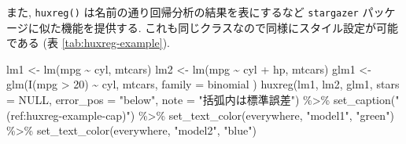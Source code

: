 \documentclass[
  xelatex,ja=standard,jafont=noto]{bxjsbook}
\newenvironment{Shaded}{\begin{snugshade}}{\end{snugshade}}
\newcommand{\AttributeTok}[1]{\textcolor[rgb]{0.77,0.63,0.00}{#1}}
\newcommand{\ConstantTok}[1]{\textcolor[rgb]{0.00,0.00,0.00}{#1}}
\newcommand{\DecValTok}[1]{\textcolor[rgb]{0.00,0.00,0.81}{#1}}
\newcommand{\FunctionTok}[1]{\textcolor[rgb]{0.00,0.00,0.00}{#1}}
\newcommand{\NormalTok}[1]{#1}
\newcommand{\OtherTok}[1]{\textcolor[rgb]{0.56,0.35,0.01}{#1}}
\newcommand{\SpecialCharTok}[1]{\textcolor[rgb]{0.00,0.00,0.00}{#1}}
\newcommand{\StringTok}[1]{\textcolor[rgb]{0.31,0.60,0.02}{#1}}
\theoremstyle{definition}
\theoremstyle{definition}
\theoremstyle{definition}
\theoremstyle{definition}
\theoremstyle{remark}
\begin{document}
また, \texttt{huxreg()} は名前の通り回帰分析の結果を表にするなど
\texttt{stargazer} パッケージに似た機能を提供する.
これも同じクラスなので同様にスタイル設定が可能である (表
\ref{tab:huxreg-example}).



\begin{Shaded}
\begin{Highlighting}[numbers=left,,]
\NormalTok{lm1 }\OtherTok{\textless{}{-}} \FunctionTok{lm}\NormalTok{(mpg }\SpecialCharTok{\textasciitilde{}}\NormalTok{ cyl, mtcars)}
\NormalTok{lm2 }\OtherTok{\textless{}{-}} \FunctionTok{lm}\NormalTok{(mpg }\SpecialCharTok{\textasciitilde{}}\NormalTok{ cyl }\SpecialCharTok{+}\NormalTok{ hp, mtcars)}
\NormalTok{glm1 }\OtherTok{\textless{}{-}} \FunctionTok{glm}\NormalTok{(}\FunctionTok{I}\NormalTok{(mpg }\SpecialCharTok{\textgreater{}} \DecValTok{20}\NormalTok{) }\SpecialCharTok{\textasciitilde{}}\NormalTok{ cyl, mtcars,}
  \AttributeTok{family =}\NormalTok{ binomial}
\NormalTok{)}
\FunctionTok{huxreg}\NormalTok{(lm1, lm2, glm1, }\AttributeTok{stars =} \ConstantTok{NULL}\NormalTok{, }\AttributeTok{error\_pos =} \StringTok{"below"}\NormalTok{, }\AttributeTok{note =} \StringTok{"括弧内は標準誤差"}\NormalTok{) }\SpecialCharTok{\%\textgreater{}\%}
  \FunctionTok{set\_caption}\NormalTok{(}\StringTok{"(ref:huxreg{-}example{-}cap)"}\NormalTok{) }\SpecialCharTok{\%\textgreater{}\%}
  \FunctionTok{set\_text\_color}\NormalTok{(everywhere, }\StringTok{"model1"}\NormalTok{, }\StringTok{"green"}\NormalTok{) }\SpecialCharTok{\%\textgreater{}\%}
  \FunctionTok{set\_text\_color}\NormalTok{(everywhere, }\StringTok{"model2"}\NormalTok{, }\StringTok{"blue"}\NormalTok{)}
\end{Highlighting}
\end{Shaded}

 
  \providecommand{\huxb}[2]{\arrayrulecolor[RGB]{#1}\global\arrayrulewidth=#2pt}
  \providecommand{\huxvb}[2]{\color[RGB]{#1}\vrule width #2pt}
  \providecommand{\huxtpad}[1]{\rule{0pt}{#1}}
  \providecommand{\huxbpad}[1]{\rule[-#1]{0pt}{#1}}
\end{document}
